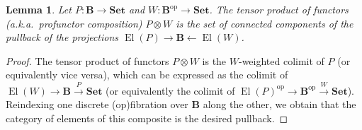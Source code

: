 \documentclass[11pt, oneside, article]{memoir}
\theoremstyle{plain}
\newtheorem{lemma}[theorem]{Lemma}
\theoremstyle{definition}
\theoremstyle{remark}
\DeclareMathOperator{\El}{El}
\DeclareMathOperator{\ophelper}{op}
\newcommand{\op}{^{\ophelper}}
\newcommand{\ot}{\leftarrow}
\newcommand{\xto}[1]{\xrightarrow{#1}}
\newcommand{\namedcat}[1]{\mathbf{#1}}
\newcommand{\cat}[1]{\mathbf{#1}}
\newcommand{\Set}{\namedcat{Set}}
\newcommand{\ph}[1]{#1}
\newcommand{\xU}{U}
\newcommand{\xV}{V}
\newcommand{\bB}{\cat{B}}
\newcommand{\pP}{\ph{P}}
\begin{document}
\begin{lemma}\label{lem:tensorbypullback}
  Let $\pP \colon \bB \to \Set$ and $W \colon \bB\op \to \Set$. The
  tensor product of functors (a.k.a.\ profunctor composition)
  $\pP \otimes W$ is the set of connected components of the pullback
  of the projections $\El(\pP) \to \bB \ot \El(W)$.
\end{lemma}
\begin{proof}

  The tensor product of functors $\pP \otimes W$ is the $W$-weighted
  colimit of $\pP$ (or equivalently vice versa), which can be
  expressed as the colimit of $\El(W) \to \bB \xto{\pP} \Set$ (or
  equivalently the colimit of $\El(\pP)\op \to \bB\op \xto{W}
  \Set$). Reindexing one discrete (op)fibration over $\bB$ along the
  other, we obtain that the category of elements of this composite is
  the desired pullback.
\end{proof}
\end{document}
